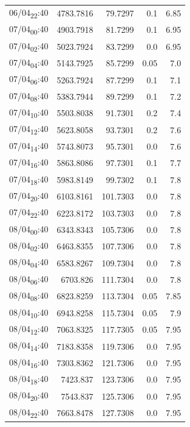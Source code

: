 \documentclass[11pt]{article}
\begin{document}
\begin{center}
\begin{tabular}{lrrrr}
06/04\textsubscript{22}:40 & 4783.7816 & 79.7297 & 0.1 & 6.85\\[0pt]
07/04\textsubscript{00}:40 & 4903.7918 & 81.7299 & 0.1 & 6.95\\[0pt]
07/04\textsubscript{02}:40 & 5023.7924 & 83.7299 & 0.0 & 6.95\\[0pt]
07/04\textsubscript{04}:40 & 5143.7925 & 85.7299 & 0.05 & 7.0\\[0pt]
07/04\textsubscript{06}:40 & 5263.7924 & 87.7299 & 0.1 & 7.1\\[0pt]
07/04\textsubscript{08}:40 & 5383.7944 & 89.7299 & 0.1 & 7.2\\[0pt]
07/04\textsubscript{10}:40 & 5503.8038 & 91.7301 & 0.2 & 7.4\\[0pt]
07/04\textsubscript{12}:40 & 5623.8058 & 93.7301 & 0.2 & 7.6\\[0pt]
07/04\textsubscript{14}:40 & 5743.8073 & 95.7301 & 0.0 & 7.6\\[0pt]
07/04\textsubscript{16}:40 & 5863.8086 & 97.7301 & 0.1 & 7.7\\[0pt]
07/04\textsubscript{18}:40 & 5983.8149 & 99.7302 & 0.1 & 7.8\\[0pt]
07/04\textsubscript{20}:40 & 6103.8161 & 101.7303 & 0.0 & 7.8\\[0pt]
07/04\textsubscript{22}:40 & 6223.8172 & 103.7303 & 0.0 & 7.8\\[0pt]
08/04\textsubscript{00}:40 & 6343.8343 & 105.7306 & 0.0 & 7.8\\[0pt]
08/04\textsubscript{02}:40 & 6463.8355 & 107.7306 & 0.0 & 7.8\\[0pt]
08/04\textsubscript{04}:40 & 6583.8267 & 109.7304 & 0.0 & 7.8\\[0pt]
08/04\textsubscript{06}:40 & 6703.826 & 111.7304 & 0.0 & 7.8\\[0pt]
08/04\textsubscript{08}:40 & 6823.8259 & 113.7304 & 0.05 & 7.85\\[0pt]
08/04\textsubscript{10}:40 & 6943.8258 & 115.7304 & 0.05 & 7.9\\[0pt]
08/04\textsubscript{12}:40 & 7063.8325 & 117.7305 & 0.05 & 7.95\\[0pt]
08/04\textsubscript{14}:40 & 7183.8358 & 119.7306 & 0.0 & 7.95\\[0pt]
08/04\textsubscript{16}:40 & 7303.8362 & 121.7306 & 0.0 & 7.95\\[0pt]
08/04\textsubscript{18}:40 & 7423.837 & 123.7306 & 0.0 & 7.95\\[0pt]
08/04\textsubscript{20}:40 & 7543.837 & 125.7306 & 0.0 & 7.95\\[0pt]
08/04\textsubscript{22}:40 & 7663.8478 & 127.7308 & 0.0 & 7.95\\[0pt]
\end{tabular}
\end{center}
\end{document}
